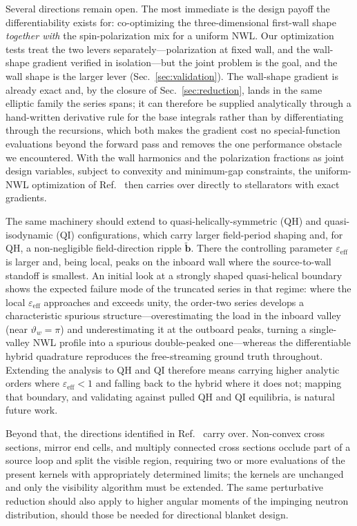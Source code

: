\documentclass[11pt]{article}
\newcommand{\bperp}{\tilde{\bm{b}}}
\newcommand{\eps}{\varepsilon}
\begin{document}
Several directions remain open. The most immediate is the design payoff the differentiability exists for: co-optimizing the three-dimensional first-wall shape \emph{together with} the spin-polarization mix for a uniform NWL. Our optimization tests treat the two levers separately---polarization at fixed wall, and the wall-shape gradient verified in isolation---but the joint problem is the goal, and the wall shape is the larger lever (Sec.~\ref{sec:validation}). The wall-shape gradient is already exact and, by the closure of Sec.~\ref{sec:reduction}, lands in the same elliptic family the series spans; it can therefore be supplied analytically through a hand-written derivative rule for the base integrals rather than by differentiating through the recursions, which both makes the gradient cost no special-function evaluations beyond the forward pass and removes the one performance obstacle we encountered. With the wall harmonics and the polarization fractions as joint design variables, subject to convexity and minimum-gap constraints, the uniform-NWL optimization of Ref.~\cite{schwartz2025} then carries over directly to stellarators with exact gradients.

The same machinery should extend to quasi-helically-symmetric (QH) and quasi-isodynamic (QI) configurations, which carry larger field-period shaping and, for QH, a non-negligible field-direction ripple $\bperp$. There the controlling parameter $\eps_{\mathrm{eff}}$ is larger and, being local, peaks on the inboard wall where the source-to-wall standoff is smallest. An initial look at a strongly shaped quasi-helical boundary shows the expected failure mode of the truncated series in that regime: where the local $\eps_{\mathrm{eff}}$ approaches and exceeds unity, the order-two series develops a characteristic spurious structure---overestimating the load in the inboard valley (near $\vartheta_w=\pi$) and underestimating it at the outboard peaks, turning a single-valley NWL profile into a spurious double-peaked one---whereas the differentiable hybrid quadrature reproduces the free-streaming ground truth throughout. Extending the analysis to QH and QI therefore means carrying higher analytic orders where $\eps_{\mathrm{eff}}<1$ and falling back to the hybrid where it does not; mapping that boundary, and validating against pulled QH and QI equilibria, is natural future work.

Beyond that, the directions identified in Ref.~\cite{schwartz2025} carry over. Non-convex cross sections, mirror end cells, and multiply connected cross sections occlude part of a source loop and split the visible region, requiring two or more evaluations of the present kernels with appropriately determined limits; the kernels are unchanged and only the visibility algorithm must be extended. The same perturbative reduction should also apply to higher angular moments of the impinging neutron distribution, should those be needed for directional blanket design.
\end{document}
